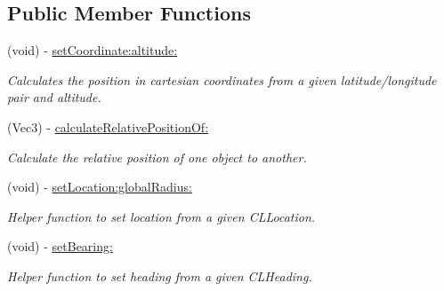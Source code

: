 \subsection*{Public Member Functions}
\begin{DoxyCompactItemize}
\item 
\hypertarget{interface_a_r_world_location_a4bc73da0825d2cd6552810f159ccb91b}{(void) -\/ \hyperlink{interface_a_r_world_location_a4bc73da0825d2cd6552810f159ccb91b}{set\-Coordinate\-:altitude\-:}}\label{interface_a_r_world_location_a4bc73da0825d2cd6552810f159ccb91b}

\begin{DoxyCompactList}\small\item\em Calculates the position in cartesian coordinates from a given latitude/longitude pair and altitude. \end{DoxyCompactList}\item 
(Vec3) -\/ \hyperlink{interface_a_r_world_location_a3e62f3cc4265c32e4044aa0ac161679a}{calculate\-Relative\-Position\-Of\-:}
\begin{DoxyCompactList}\small\item\em Calculate the relative position of one object to another. \end{DoxyCompactList}\item 
\hypertarget{interface_a_r_world_location_a16a712dce023f2813ac41696ec5fc441}{(void) -\/ \hyperlink{interface_a_r_world_location_a16a712dce023f2813ac41696ec5fc441}{set\-Location\-:global\-Radius\-:}}\label{interface_a_r_world_location_a16a712dce023f2813ac41696ec5fc441}

\begin{DoxyCompactList}\small\item\em Helper function to set location from a given C\-L\-Location. \end{DoxyCompactList}\item 
\hypertarget{interface_a_r_world_location_a31c6edb0dc4a98b788045f924ab99c37}{(void) -\/ \hyperlink{interface_a_r_world_location_a31c6edb0dc4a98b788045f924ab99c37}{set\-Bearing\-:}}\label{interface_a_r_world_location_a31c6edb0dc4a98b788045f924ab99c37}

\begin{DoxyCompactList}\small\item\em Helper function to set heading from a given C\-L\-Heading. \end{DoxyCompactList}\end{DoxyCompactItemize}
